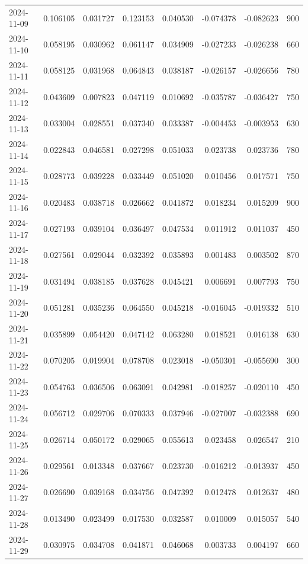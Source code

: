 \begin{tabular}{lrrrrrrr}
2024-11-09 & 0.106105 & 0.031727 & 0.123153 & 0.040530 & -0.074378 & -0.082623 & 900 \\
2024-11-10 & 0.058195 & 0.030962 & 0.061147 & 0.034909 & -0.027233 & -0.026238 & 660 \\
2024-11-11 & 0.058125 & 0.031968 & 0.064843 & 0.038187 & -0.026157 & -0.026656 & 780 \\
2024-11-12 & 0.043609 & 0.007823 & 0.047119 & 0.010692 & -0.035787 & -0.036427 & 750 \\
2024-11-13 & 0.033004 & 0.028551 & 0.037340 & 0.033387 & -0.004453 & -0.003953 & 630 \\
2024-11-14 & 0.022843 & 0.046581 & 0.027298 & 0.051033 & 0.023738 & 0.023736 & 780 \\
2024-11-15 & 0.028773 & 0.039228 & 0.033449 & 0.051020 & 0.010456 & 0.017571 & 750 \\
2024-11-16 & 0.020483 & 0.038718 & 0.026662 & 0.041872 & 0.018234 & 0.015209 & 900 \\
2024-11-17 & 0.027193 & 0.039104 & 0.036497 & 0.047534 & 0.011912 & 0.011037 & 450 \\
2024-11-18 & 0.027561 & 0.029044 & 0.032392 & 0.035893 & 0.001483 & 0.003502 & 870 \\
2024-11-19 & 0.031494 & 0.038185 & 0.037628 & 0.045421 & 0.006691 & 0.007793 & 750 \\
2024-11-20 & 0.051281 & 0.035236 & 0.064550 & 0.045218 & -0.016045 & -0.019332 & 510 \\
2024-11-21 & 0.035899 & 0.054420 & 0.047142 & 0.063280 & 0.018521 & 0.016138 & 630 \\
2024-11-22 & 0.070205 & 0.019904 & 0.078708 & 0.023018 & -0.050301 & -0.055690 & 300 \\
2024-11-23 & 0.054763 & 0.036506 & 0.063091 & 0.042981 & -0.018257 & -0.020110 & 450 \\
2024-11-24 & 0.056712 & 0.029706 & 0.070333 & 0.037946 & -0.027007 & -0.032388 & 690 \\
2024-11-25 & 0.026714 & 0.050172 & 0.029065 & 0.055613 & 0.023458 & 0.026547 & 210 \\
2024-11-26 & 0.029561 & 0.013348 & 0.037667 & 0.023730 & -0.016212 & -0.013937 & 450 \\
2024-11-27 & 0.026690 & 0.039168 & 0.034756 & 0.047392 & 0.012478 & 0.012637 & 480 \\
2024-11-28 & 0.013490 & 0.023499 & 0.017530 & 0.032587 & 0.010009 & 0.015057 & 540 \\
2024-11-29 & 0.030975 & 0.034708 & 0.041871 & 0.046068 & 0.003733 & 0.004197 & 660 \\

\end{tabular}
